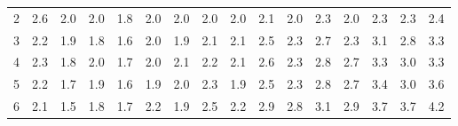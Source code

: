 \begin{table}[!htbp]
{\begin{tabular}{c|ccccccccccccccc}
        \rowcolor[HTML]{FFFFFF}
        2                          & \multicolumn{1}{l|}{2.6} & \cellcolor[HTML]{CCC0DA}2.0 & \cellcolor[HTML]{CCC0DA}2.0 & \cellcolor[HTML]{CCC0DA}1.8 & \cellcolor[HTML]{CCC0DA}2.0 & \cellcolor[HTML]{CCC0DA}2.0 & \multicolumn{1}{l|}{\cellcolor[HTML]{CCC0DA}2.0} & \cellcolor[HTML]{CCC0DA}2.0 & 2.1                       & \cellcolor[HTML]{CCC0DA}2.0                         & 2.3                         & \cellcolor[HTML]{CCC0DA}2.0                        & 2.3                         & 2.3                         & 2.4                         \\
\rowcolor[HTML]{FFFFFF}  
        3                          & \multicolumn{1}{l|}{\cellcolor[HTML]{FFFFFF}2.2} & \cellcolor[HTML]{CCC0DA}1.9 & \cellcolor[HTML]{CCC0DA}1.8 & \cellcolor[HTML]{CCC0DA}1.6 & \cellcolor[HTML]{CCC0DA}2.0 & \multicolumn{1}{l|}{\cellcolor[HTML]{CCC0DA}1.9} & 2.1                        & 2.1                         & 2.5                         & 2.3                         & 2.7                         & 2.3                         & 3.1                         & 2.8                         & 3.3                         \\
        \rowcolor[HTML]{FFFFFF} 
        4                          & \multicolumn{1}{l|}{\cellcolor[HTML]{FFFFFF}2.3} & \cellcolor[HTML]{CCC0DA}1.8 & \cellcolor[HTML]{CCC0DA}2.0 & \cellcolor[HTML]{CCC0DA}1.7 & \cellcolor[HTML]{CCC0DA}2.0 & \multicolumn{1}{l|}{\cellcolor[HTML]{FFFFFF}2.1} & 2.2                        & 2.1                         & 2.6                         & 2.3                         & 2.8                         & 2.7                         & 3.3                         & 3.0                         & 3.3                         \\
        \rowcolor[HTML]{FFFFFF} 
        5                          & \multicolumn{1}{l|}{\cellcolor[HTML]{FFFFFF}2.2} & \cellcolor[HTML]{CCC0DA}1.7 & \cellcolor[HTML]{CCC0DA}1.9 & \cellcolor[HTML]{CCC0DA}1.6 & \cellcolor[HTML]{CCC0DA}1.9 & \multicolumn{1}{l|}{\cellcolor[HTML]{CCC0DA}2.0} & 2.3                        & \cellcolor[HTML]{CCC0DA}1.9 & 2.5                         & 2.3                         & 2.8                         & 2.7                         & 3.4                         & 3.0                         & 3.6                         \\
        \rowcolor[HTML]{FFFFFF} 
        6                          & \multicolumn{1}{l|}{\cellcolor[HTML]{FFFFFF}2.1} & \cellcolor[HTML]{B1A0C7}1.5 & \cellcolor[HTML]{CCC0DA}1.8 & \cellcolor[HTML]{CCC0DA}1.7 & 2.2                         & \multicolumn{1}{l|}{\cellcolor[HTML]{CCC0DA}1.9} & 2.5                        & 2.2                         & 2.9                         & 2.8                         & 3.1                         & 2.9                         & 3.7                         & 3.7                         & 4.2                         \\

\end{tabular}}
\end{table}
